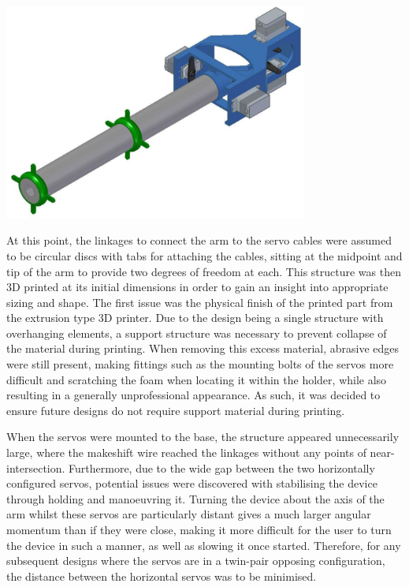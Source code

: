 \documentclass[11pt]{article}
\begin{document}
\begin{center}
\includegraphics[width=0.75\textwidth]{images/initialConcept.png}
\label{figure:initialConcept}
\end{center}

At this point, the linkages to connect the arm to the servo cables were assumed to be circular discs with tabs for attaching the cables, sitting at the midpoint and tip of the arm to provide two degrees of freedom at each. This structure was then 3D printed at its initial dimensions in order to gain an insight into appropriate sizing and shape. The first issue was the physical finish of the printed part from the extrusion type 3D printer. Due to the design being a single structure with overhanging elements, a support structure was necessary to prevent collapse of the material during printing. When removing this excess material, abrasive edges were still present, making fittings such as the mounting bolts of the servos more difficult and scratching the foam when locating it within the holder, while also resulting in a generally unprofessional appearance. As such, it was decided to ensure future designs do not require support material during printing. 

When the servos were mounted to the base, the structure appeared unnecessarily large, where the makeshift wire reached the linkages without any points of near-intersection. Furthermore, due to the wide gap between the two horizontally configured servos, potential issues were discovered with stabilising the device through holding and manoeuvring it. Turning the device about the axis of the arm whilst these servos are particularly distant gives a much larger angular momentum than if they were close, making it more difficult for the user to turn the device in such a manner, as well as slowing it once started. Therefore, for any subsequent designs where the servos are in a twin-pair opposing configuration, the distance between the horizontal servos was to be minimised.
\end{document}
